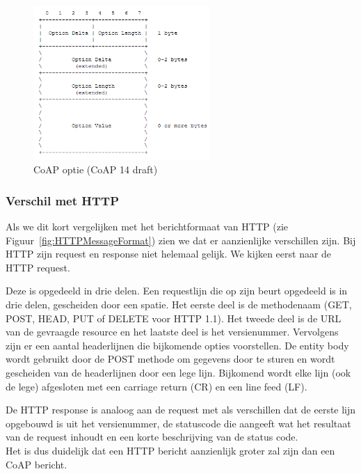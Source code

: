 \begin{figure}[h]
\centering
\includegraphics[width=0.6\textwidth]{fig/CoAPOpties}
\vspace{-10pt}
\caption{CoAP optie (CoAP 14 draft)}
\label{fig:CoAPOpties}
\end{figure}

\newpage

\subsubsection{Verschil met HTTP}

Als we dit kort vergelijken met het berichtformaat van HTTP (zie Figuur~\ref{fig:HTTPMessageFormat}) zien we dat er aanzienlijke verschillen zijn. Bij HTTP zijn request en response niet helemaal gelijk. We kijken eerst naar de HTTP request.

Deze is opgedeeld in drie delen. Een requestlijn die op zijn beurt opgedeeld is in drie delen, gescheiden door een spatie. Het eerste deel is de methodenaam (GET, POST, HEAD, PUT of DELETE voor HTTP 1.1). Het tweede deel is de URL van de gevraagde resource en het laatste deel is het versienummer. Vervolgens zijn er een aantal headerlijnen die bijkomende opties voorstellen. De entity body wordt gebruikt door de POST methode om gegevens door te sturen en wordt gescheiden van de headerlijnen door een lege lijn. Bijkomend wordt elke lijn (ook de lege) afgesloten met een carriage return (CR) en een line feed (LF).

De HTTP response is analoog aan de request met als verschillen dat de eerste lijn opgebouwd is uit het versienummer, de statuscode die aangeeft wat het resultaat van de request inhoudt en een korte beschrijving van de status code.\\
Het is dus duidelijk dat een HTTP bericht aanzienlijk groter zal zijn dan een CoAP bericht.


